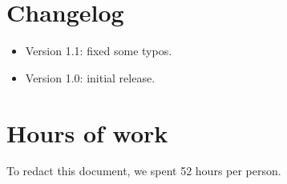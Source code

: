  \begin{appendices}

\chapter{Changelog}
\begin{itemize}
	\item Version 1.1: fixed some typos.
	\item Version 1.0: initial release.
\end{itemize}

\chapter{Hours of work}
To redact this document, we spent 52 hours per person.



\end{appendices}